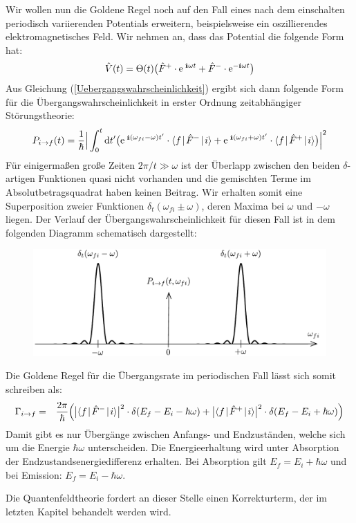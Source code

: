 Wir wollen nun die Goldene Regel noch auf den Fall eines nach dem einschalten periodisch variierenden Potentials erweitern, beispielsweise ein oszillierendes elektromagnetisches Feld. Wir nehmen an, dass das Potential die folgende Form hat: 
\begin{eqnarray*}
	\hat{V}(t) = \Theta(t)\big(\hat{F}^+ \cdot \e^{\;\I\omega t} + \hat{F}^- \cdot \e^{-\I\omega t}\big)
\end{eqnarray*}
Aus Gleichung (\ref{Uebergangswahrscheinlichkeit}) ergibt sich dann folgende Form für die Übergangswahrscheinlichkeit in erster Ordnung zeitabhängiger Störungstheorie: 
\begin{eqnarray*}
	P_{i\rightarrow f} (t) = \frac{1}{\hbar} \Big| \int_0^t \mathrm{d}t' \big(\e^{\;\I(\omega_{fi}-\omega)t'}\cdot\bracket{f}{\hat{F}^-}{i} + \e^{\;\I(\omega_{fi}+\omega)t'}\cdot\bracket{f}{\hat{F}^+}{i} \big) \Big|^2
\end{eqnarray*}
Für einigermaßen große Zeiten $2\pi/t\gg\omega$ ist der Überlapp zwischen den beiden $\delta$-artigen Funktionen quasi nicht vorhanden und die gemischten Terme im Absolutbetragsquadrat haben keinen Beitrag. Wir erhalten somit eine Superposition zweier Funktionen $\delta_t(\omega_{fi}\pm\omega)$, deren Maxima bei $\omega$ und $-\omega$ liegen. Der Verlauf der Übergangswahrscheinlichkeit für diesen Fall ist in dem folgenden Diagramm schematisch dargestellt:\newpage 
\begin{figure}[!h] \centering
\includegraphics[scale=0.75]{Figs/DoppelSinPlot}
\end{figure}\vspace{-2ex}

Die Goldene Regel für die Übergangsrate im periodischen Fall lässt sich somit schreiben als: 
\begin{eqnarray*}
	\Gamma_{i\rightarrow f} &=& \frac{2\pi}{\hbar} \Big( \big|\bracket{f}{\hat{F}^-}{i}\big|^2\cdot \delta(E_f-E_i-\hbar \omega) + \big|\bracket{f}{\hat{F}^+}{i}\big|^2\cdot \delta(E_f-E_i +\hbar \omega) \Big)
\end{eqnarray*}
Damit gibt es nur Übergänge zwischen Anfangs- und Endzuständen, welche sich um die Energie $\hbar\omega$ unterscheiden. Die Energieerhaltung wird unter Absorption der Endzustandsenergiedifferenz erhalten. Bei Absorption gilt $E_f=E_i+\hbar\omega$ und bei Emission: $E_f=E_i-\hbar\omega$. 

Die Quantenfeldtheorie fordert an dieser Stelle einen Korrekturterm, der im letzten Kapitel behandelt werden wird.

%
